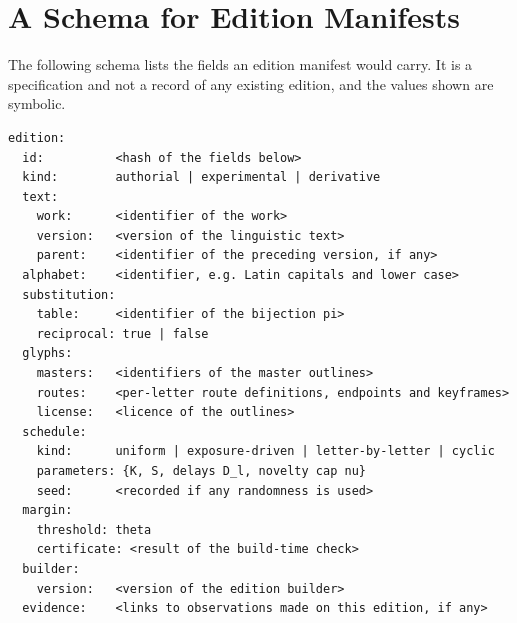 \section{A Schema for Edition Manifests}\label{app:manifest}

The following schema lists the fields an edition manifest would carry. It is a specification and not a record of any existing edition, and the values shown are symbolic.

\begin{lstlisting}[language={}]
edition:
  id:          <hash of the fields below>
  kind:        authorial | experimental | derivative
  text:
    work:      <identifier of the work>
    version:   <version of the linguistic text>
    parent:    <identifier of the preceding version, if any>
  alphabet:    <identifier, e.g. Latin capitals and lower case>
  substitution:
    table:     <identifier of the bijection pi>
    reciprocal: true | false
  glyphs:
    masters:   <identifiers of the master outlines>
    routes:    <per-letter route definitions, endpoints and keyframes>
    license:   <licence of the outlines>
  schedule:
    kind:      uniform | exposure-driven | letter-by-letter | cyclic
    parameters: {K, S, delays D_l, novelty cap nu}
    seed:      <recorded if any randomness is used>
  margin:
    threshold: theta
    certificate: <result of the build-time check>
  builder:
    version:   <version of the edition builder>
  evidence:    <links to observations made on this edition, if any>
\end{lstlisting}
